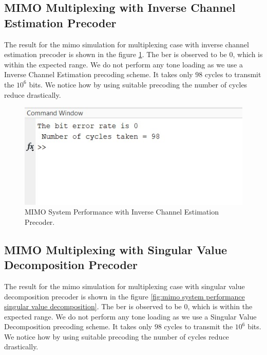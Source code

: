\subsection{MIMO Multiplexing with Inverse Channel Estimation Precoder}

The result for the \acrshort{mimo} simulation for multiplexing case with inverse channel estimation precoder is shown in the figure \ref{fig:mimo system performance inverse channel estimation}. The \acrshort{ber} is observed to be $0$, which is within the expected range. We do not perform any tone loading as we use a Inverse Channel Estimation precoding scheme. It takes only $98$ cycles to transmit the $10^6$ bits. We notice how by using suitable precoding the number of cycles reduce drastically.

\begin{figure}[!htbp]
\centering
\includegraphics[scale=1]{Chapter 4/Figures/MIMO System Performance Inverse Channel Estimation}
\caption{MIMO System Performance with Inverse Channel Estimation Precoder.}
\label{fig:mimo system performance inverse channel estimation}
\end{figure}

\subsection{MIMO Multiplexing with Singular Value Decomposition Precoder}

The result for the \acrshort{mimo} simulation for multiplexing case with singular value decomposition precoder is shown in the figure \ref{fig:mimo system performance singular value decomposition}. The \acrshort{ber} is observed to be $0$, which is within the expected range. We do not perform any tone loading as we use a Singular Value Decomposition precoding scheme. It takes only $98$ cycles to transmit the $10^6$ bits. We notice how by using suitable precoding the number of cycles reduce drastically.

